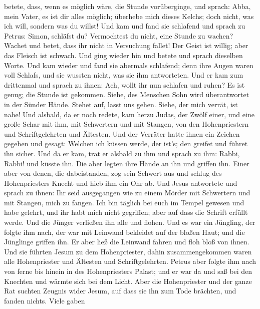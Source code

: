 betete, dass, wenn es möglich wäre, die Stunde vorüberginge,
 und sprach: Abba, mein Vater, es ist dir alles möglich;
überhebe mich dieses Kelchs; doch nicht, was ich will, sondern was du
willst!  Und kam und fand sie schlafend und sprach zu
Petrus: Simon, schläfst du? Vermochtest du nicht, eine Stunde zu wachen?
 Wachet und betet, dass ihr nicht in Versuchung fallet! Der
Geist ist willig; aber das Fleisch ist schwach.  Und ging
wieder hin und betete und sprach dieselben Worte.  Und kam
wieder und fand sie abermals schlafend; denn ihre Augen waren voll
Schlafs, und sie wussten nicht, was sie ihm antworteten. 
Und er kam zum drittenmal und sprach zu ihnen: Ach, wollt ihr nun
schlafen und ruhen? Es ist genug; die Stunde ist gekommen. Siehe, des
Menschen Sohn wird überantwortet in der Sünder Hände. 
Stehet auf, lasst uns gehen. Siehe, der mich verrät, ist nahe!
 Und alsbald, da er noch redete, kam herzu Judas, der Zwölf
einer, und eine große Schar mit ihm, mit Schwertern und mit Stangen, von
den Hohenpriestern und Schriftgelehrten und Ältesten.  Und
der Verräter hatte ihnen ein Zeichen gegeben und gesagt: Welchen ich
küssen werde, der ist's; den greifet und führet ihn sicher.
 Und da er kam, trat er alsbald zu ihm und sprach zu ihm:
Rabbi, Rabbi! und küsste ihn.  Die aber legten ihre Hände
an ihn und griffen ihn.  Einer aber von denen, die
dabeistanden, zog sein Schwert aus und schlug des Hohenpriesters Knecht
und hieb ihm ein Ohr ab.  Und Jesus antwortete und sprach
zu ihnen: Ihr seid ausgegangen wie zu einem Mörder mit Schwertern und
mit Stangen, mich zu fangen.  Ich bin täglich bei euch im
Tempel gewesen und habe gelehrt, und ihr habt mich nicht gegriffen; aber
auf dass die Schrift erfüllt werde.  Und die Jünger
verließen ihn alle und flohen.  Und es war ein Jüngling,
der folgte ihm nach, der war mit Leinwand bekleidet auf der bloßen Haut;
und die Jünglinge griffen ihn.  Er aber ließ die Leinwand
fahren und floh bloß von ihnen.  Und sie führten Jesum zu
dem Hohenpriester, dahin zusammengekommen waren alle Hohenpriester und
Ältesten und Schriftgelehrten.  Petrus aber folgte ihm nach
von ferne bis hinein in des Hohenpriesters Palast; und er war da und saß
bei den Knechten und wärmte sich bei dem Licht.  Aber die
Hohenpriester und der ganze Rat suchten Zeugnis wider Jesum, auf dass
sie ihn zum Tode brächten, und fanden nichts.  Viele gaben
